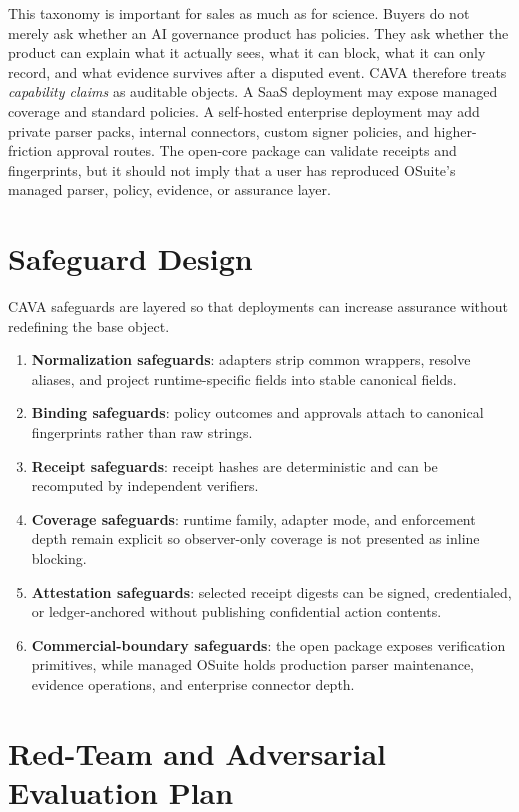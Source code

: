 \documentclass[11pt]{article}
\begin{document}
This taxonomy is important for sales as much as for science. Buyers do not merely ask whether an AI governance product has policies. They ask whether the product can explain what it actually sees, what it can block, what it can only record, and what evidence survives after a disputed event. CAVA therefore treats \emph{capability claims} as auditable objects. A SaaS deployment may expose managed coverage and standard policies. A self-hosted enterprise deployment may add private parser packs, internal connectors, custom signer policies, and higher-friction approval routes. The open-core package can validate receipts and fingerprints, but it should not imply that a user has reproduced OSuite's managed parser, policy, evidence, or assurance layer.

\section{Safeguard Design}

CAVA safeguards are layered so that deployments can increase assurance without redefining the base object.

\begin{enumerate}
  \item \textbf{Normalization safeguards}: adapters strip common wrappers, resolve aliases, and project runtime-specific fields into stable canonical fields.
  \item \textbf{Binding safeguards}: policy outcomes and approvals attach to canonical fingerprints rather than raw strings.
  \item \textbf{Receipt safeguards}: receipt hashes are deterministic and can be recomputed by independent verifiers.
  \item \textbf{Coverage safeguards}: runtime family, adapter mode, and enforcement depth remain explicit so observer-only coverage is not presented as inline blocking.
  \item \textbf{Attestation safeguards}: selected receipt digests can be signed, credentialed, or ledger-anchored without publishing confidential action contents.
  \item \textbf{Commercial-boundary safeguards}: the open package exposes verification primitives, while managed OSuite holds production parser maintenance, evidence operations, and enterprise connector depth.
\end{enumerate}

\section{Red-Team and Adversarial Evaluation Plan}
\end{document}
